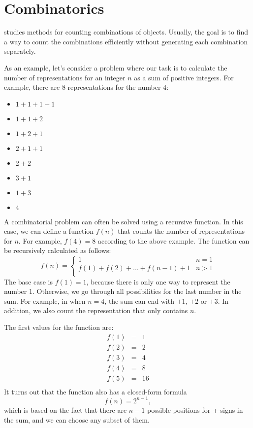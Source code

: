 \chapter{Combinatorics}


 studies methods for counting
combinations of objects.
Usually, the goal is to find a way to
count the combinations efficiently
without generating each combination separately.

As an example, let's consider a problem where
our task is to calculate the number of representations
for an integer $n$ as a sum of positive integers.
For example, there are 8 representations
for the number $4$:
\begin{multicols}{2}
\begin{itemize}
\item $1+1+1+1$
\item $1+1+2$
\item $1+2+1$
\item $2+1+1$
\item $2+2$
\item $3+1$
\item $1+3$
\item $4$
\end{itemize}
\end{multicols}

A combinatorial problem can often be solved
using a recursive function.
In this case, we can define a function $f(n)$
that counts the number of representations for $n$.
For example, $f(4)=8$ according to the above example.
The function can be recursively calculated as follows:
\begin{equation*}
    f(n) = \begin{cases}
               1               & n = 1\\
               f(1)+f(2)+\ldots+f(n-1)+1 & n > 1\\
           \end{cases}
\end{equation*}
The base case is $f(1)=1$,
because there is only one way to represent the number 1.
Otherwise, we go through all possibilities for
the last number in the sum.
For example, in when $n=4$, the sum can end
with $+1$, $+2$ or $+3$.
In addition, we also count the representation
that only contains $n$.

The first values for the function are:
\[
\begin{array}{lcl}
f(1) & = & 1 \\
f(2) & = & 2 \\
f(3) & = & 4 \\
f(4) & = & 8 \\
f(5) & = & 16 \\
\end{array}
\]
It turns out that the function also has a closed-form formula
\[
f(n)=2^{n-1},
\]
which is based on the fact that there are $n-1$
possible positions for +-signs in the sum,
and we can choose any subset of them.

